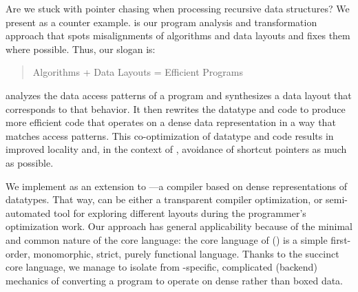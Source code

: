 Are we stuck with pointer chasing when processing recursive data structures?
We present \system{} as a counter example. \system{} is our program analysis
and transformation approach that spots misalignments of algorithms and data
layouts and fixes them where possible. Thus, our slogan is:
\begin{quote}
Algorithms + Data Layouts = Efficient Programs
\end{quote}


\system analyzes the data access patterns of a program and synthesizes a data layout that corresponds to that behavior.
%
It then rewrites the datatype and code to produce more efficient code that
operates on a dense data representation in a way that matches access patterns.
This co-optimization of datatype and code results in improved locality and, in the context of \gibbon,
avoidance of shortcut pointers as much as possible.

We implement \system{} as an extension to \gibbon---a
compiler based on dense representations of datatypes.
That way, \system can be either a transparent compiler optimization, or semi-automated tool for exploring different layouts during the programmer's optimization work.
%
Our approach has general applicability because of the minimal and common nature of the core language:
%
the core language of \system ()
is a simple first-order, monomorphic, strict, purely functional language.
Thanks to the succinct core language,
we manage to isolate \system from \gibbon-specific, complicated (backend) mechanics of converting a program
to operate on dense rather than boxed data.
%
%

